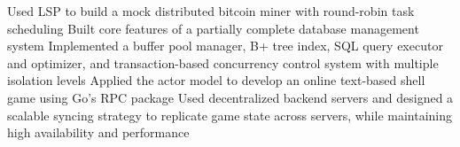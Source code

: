 \documentclass[]{paws}
\begin{document}
{    {Used LSP to build a mock distributed bitcoin miner with round-robin task scheduling}
    \subsectionbreak{}
    {Built core features of a partially complete database management system}
    {Implemented a buffer pool manager, B+ tree index, SQL query executor and optimizer, and transaction-based concurrency control system with multiple isolation levels}
    \subsectionbreak{}
    {Applied the actor model to develop an online text-based shell game using Go's RPC package}
    {Used decentralized backend servers and designed a scalable syncing strategy to replicate game state across servers, while maintaining high availability and performance}

    

}
\end{document}
